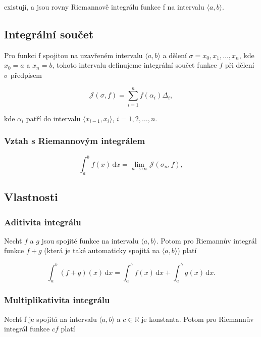 \documentclass{szzclass}
\begin{document}
existují, a jsou rovny Riemannově integrálu funkce f na intervalu $\langle a,b \rangle$.


\subsection{Integrální součet}
Pro funkci f spojitou na uzavřeném intervalu $\langle a,b \rangle$
a dělení $\sigma={x_0,x_1,…,x_n}$, kde $x_0=a$ a $x_n=b$,
tohoto intervalu definujeme integrální součet funkce $f$
při dělení $σ$ předpisem

\begin{equation*}
\mathcal{J}(\sigma,f) = \sum_{i=1}^n f(\alpha_i) \Delta_i,\end{equation*}

kde $\alpha_i$ patří do intervalu $\langle x_{i−1},x_i\rangle$, $i=1,2,…,n$.

\subsubsection{Vztah s Riemannovým integrálem}

\begin{equation*}
\int_a^b f(x) \,\mathrm{d}x = \lim_{n\to\infty} \mathcal{J}(\sigma_n,f),\end{equation*}

\subsection{Vlastnosti}
\subsubsection{Aditivita integrálu}
Nechť $f$ a $g$ jsou spojité funkce na intervalu $\langle a,b \rangle$.
Potom pro Riemannův integrál funkce $f+g$ (která je také automaticky
spojitá na $\langle a,b \rangle$) platí

\begin{equation*}
\int_a^b (f+g)(x)\,\mathrm{d}x = \int_a^b f(x)\,\mathrm{d}x + \int_a^b g(x)\,\mathrm{d}x.\end{equation*}

\subsubsection{Multiplikativita integrálu}
Nechť f je spojitá na intervalu $\langle a,b \rangle$ a $c\in \mathbb{R}$
je konstanta. Potom pro Riemannův integrál funkce $cf$ platí
\end{document}
